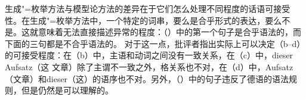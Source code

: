 生成"=枚举方法与模型论方法的差异在于它们怎么处理不同程度的话语可接受性。在生成"=枚举方法中，一个特定的词串，要么是合乎形式的表达，要么不是。这就意味着无法直接描述异常的程度：（）中的第一个句子是合乎语法的，而下面的三句都是不合乎语法的。
\eal
{}
\zl
对于这一点，批评者指出实际上可以决定（b--d）的可接受程度：在（b）中，主语和动词之间没有一致关系，在（c）中，dieser Aufsatz（这 文章）除了主谓不一致之外，格关系也不对，在（d）中，Aufsatz（文章）和dieser（这）的语序也不对。另外，（）中的句子违反了德语的语法规则，但是仍然是可以理解的。
